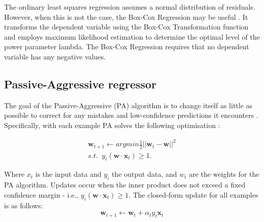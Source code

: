 The ordinary least squares regression assumes a normal distribution of residuals. However, when this is not the case, the Box-Cox Regression may be useful \cite{Box1964}. It transforms the dependent variable using the Box-Cox Transformation function and employs maximum likelihood estimation to determine the optimal level of the power parameter lambda. The Box-Cox Regression requires that no dependent variable has any negative values.


%
%
%
%

\subsection{Passive-Aggressive regressor}

The goal of the Passive-Aggressive (PA) algorithm is to change itself as little as possible to correct for any mistakes and low-confidence predictions it encounters \cite{Gzik2014}. Specifically, with each example PA solves the following optimisation \cite{Ma2009}:

\begin{align}
    \boldsymbol{w}_{t+1}\leftarrow argmin \frac{1}{2}\left|\left|{\boldsymbol{w}_t-\boldsymbol{w}}\right|\right|^2 \\
    s.t. \; \; y_i(\boldsymbol{w}\cdot \boldsymbol{x}_t)\geq1.
\end{align}

\noindent Where $x_t$ is the input data and $y_i$ the output data, and $w_t$ are the weights for the PA algorithm. Updates occur when the inner product does not exceed a fixed confidence margin - i.e., $y_i(\boldsymbol{w}\cdot \boldsymbol{x}_t)\geq1$. The closed-form update for all examples is as follows:
\begin{equation}
    \boldsymbol{w}_{t+1}\leftarrow \boldsymbol{w}_{t} + \alpha_t y_t \boldsymbol{x}_t
\end{equation}


